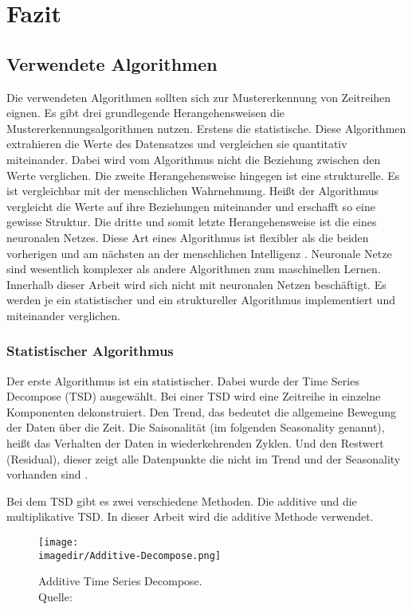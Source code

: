 \chapter{Fazit}

\section{Verwendete Algorithmen}
Die verwendeten Algorithmen sollten sich zur Mustererkennung von Zeitreihen eignen. Es gibt drei grundlegende Herangehensweisen die Mustererkennungsalgorithmen nutzen. Erstens die statistische. Diese Algorithmen extrahieren die Werte des Datensatzes und vergleichen sie quantitativ miteinander. Dabei wird vom Algorithmus nicht die Beziehung zwischen den Werte verglichen. Die zweite Herangehensweise hingegen ist eine strukturelle. Es ist vergleichbar mit der menschlichen Wahrnehmung. Heißt der Algorithmus vergleicht die Werte auf ihre Beziehungen miteinander und erschafft so eine gewisse Struktur. Die dritte und somit letzte Herangehensweise ist die eines neuronalen Netzes. Diese Art eines Algorithmus ist flexibler als die beiden vorherigen und am nächsten an der menschlichen Intelligenz \autocite[Vgl.][]{.07022021}. Neuronale Netze sind wesentlich komplexer als andere Algorithmen zum maschinellen Lernen. Innerhalb dieser Arbeit wird sich nicht mit neuronalen Netzen beschäftigt. Es werden je ein statistischer und ein struktureller Algorithmus implementiert und miteinander verglichen.

\subsection{Statistischer Algorithmus}

Der erste Algorithmus ist ein statistischer. Dabei wurde der Time Series Decompose (TSD) ausgewählt. Bei einer TSD wird eine Zeitreihe in einzelne Komponenten dekonstruiert. Den Trend, das bedeutet die allgemeine Bewegung der Daten über die Zeit. Die Saisonalität (im folgenden Seasonality genannt), heißt das Verhalten der Daten in wiederkehrenden Zyklen. Und den Restwert (Residual), dieser zeigt alle Datenpunkte die nicht im Trend und der Seasonality vorhanden sind \autocite[Vgl.][]{Radecic.15.7.2021}.

Bei dem TSD gibt es zwei verschiedene Methoden. Die additive und die multiplikative TSD. In dieser Arbeit wird die additive Methode verwendet.

\begin{figure}[H]
	
	\centering
	\texttt{[image: \\imagedir/Additive-Decompose.png]}
	\captionsetup{format=hang}
	\caption[Additive Time Series Decompose]{\label{fig:test}Additive Time Series Decompose. \\Quelle: 
	\autocite{Radecic.15.7.2021}}

\end{figure}

